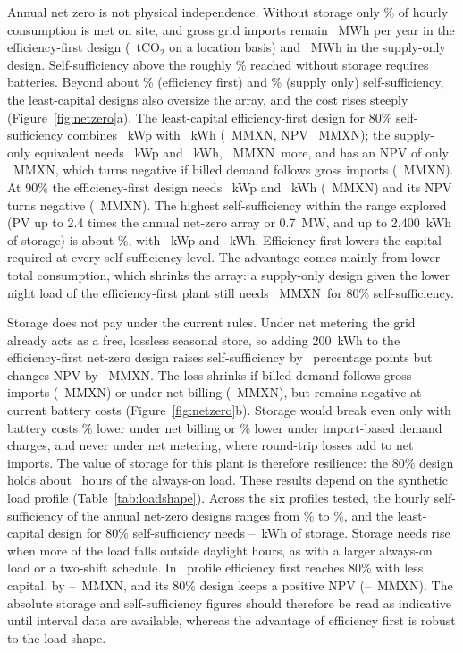 \documentclass[processes,article,submit,pdftex,moreauthors]{Definitions/mdpi}
\newcommand{\MXN}{MXN}
\begin{document}
Annual net zero is not physical independence. Without storage only \nSSNZE\% of hourly consumption is met on site, and gross grid imports remain \nImpNZE~MWh per year in the efficiency-first design (\nCOGrossNZE~tCO$_2$ on a location basis) and \nImpNZS~MWh in the supply-only design. Self-sufficiency above the roughly \nFirstBattery\% reached without storage requires batteries. Beyond about \nFirstOversizeE\% (efficiency first) and \nFirstOversizeS\% (supply only) self-sufficiency, the least-capital designs also oversize the array, and the cost rises steeply (Figure~\ref{fig:netzero}a). The least-capital efficiency-first design for 80\% self-sufficiency combines \nKWpSSE~kWp with \nBatSSE~kWh (\nCapexSSE~M\MXN, NPV \nNPVSSE~M\MXN); the supply-only equivalent needs \nKWpSSS~kWp and \nBatSSS~kWh, \nSSEightyCapexSave~M\MXN\ more, and has an NPV of only \nNPVSSS~M\MXN, which turns negative if billed demand follows gross imports (\nNPVImpSSS~M\MXN). At 90\% the efficiency-first design needs \nKWpSSNE~kWp and \nBatSSNE~kWh (\nCapexSSNE~M\MXN) and its NPV turns negative (\nNPVSSNE~M\MXN). The highest self-sufficiency within the range explored (PV up to 2.4 times the annual net-zero array or 0.7~MW, and up to 2,400~kWh of storage) is about \nMaxSSE\%, with \nMaxSSKWp~kWp and \nMaxSSBat~kWh. Efficiency first lowers the capital required at every self-sufficiency level. The advantage comes mainly from lower total consumption, which shrinks the array: a supply-only design given the lower night load of the efficiency-first plant still needs \nSupplyLowNightCapex~M\MXN\ for 80\% self-sufficiency.

Storage does not pay under the current rules. Under net metering the grid already acts as a free, lossless seasonal store, so adding 200~kWh to the efficiency-first net-zero design raises self-sufficiency by \nBatMargSS\ percentage points but changes NPV by \nBatMargNM~M\MXN. The loss shrinks if billed demand follows gross imports (\nBatMargImp~M\MXN) or under net billing (\nBatMargNB~M\MXN), but remains negative at current battery costs (Figure~\ref{fig:netzero}b). Storage would break even only with battery costs \nBatBENB\% lower under net billing or \nBatBEImp\% lower under import-based demand charges, and never under net metering, where round-trip losses add to net imports. The value of storage for this plant is therefore resilience: the 80\% design holds about \nAutoSSE~hours of the always-on load. These results depend on the synthetic load profile (Table~\ref{tab:loadshape}). Across the six profiles tested, the hourly self-sufficiency of the annual net-zero designs ranges from \nLSSSLo\% to \nLSSSHi\%, and the least-capital design for 80\% self-sufficiency needs \nLSBatLo--\nLSBatHi~kWh of storage. Storage needs rise when more of the load falls outside daylight hours, as with a larger always-on load or a two-shift schedule. In \nLSAllCheaper\ profile efficiency first reaches 80\% with less capital, by \nLSSaveLo--\nLSSaveHi~M\MXN, and its 80\% design keeps a positive NPV (\nLSNPVLo--\nLSNPVHi~M\MXN). The absolute storage and self-sufficiency figures should therefore be read as indicative until interval data are available, whereas the advantage of efficiency first is robust to the load shape.
\end{document}
